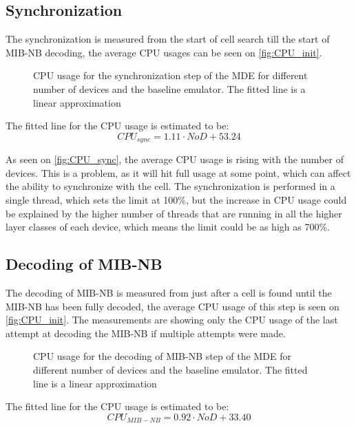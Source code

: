 \subsection{Synchronization}
The synchronization is  measured from the start of cell search till the start of MIB-NB decoding, the average CPU usages can be seen on \autoref{fig:CPU_init}.

\begin{figure}[H]
\centering
\resizebox{0.5\textwidth}{!}{
}
\caption{CPU usage for the synchronization step of the MDE for different number of devices and the baseline emulator. The fitted line is a linear approximation}
\label{fig:CPU_sync}
\end{figure}

The fitted line for the CPU usage is estimated to be:
\begin{equation}
CPU_{sync} = 1.11 \cdot NoD + 53.24
\end{equation}

As seen on \autoref{fig:CPU_sync}, the average CPU usage is rising with the number of devices. This is a problem, as it will hit full usage at some point, which can affect the ability to synchronize with the cell. The synchronization is performed in a single thread, which sets the limit at 100\%, but the increase in CPU usage could be explained by the higher number of threads that are running in all the higher layer classes of each device, which means the limit could be as high as 700\%. 

\subsection{Decoding of MIB-NB}
The decoding of MIB-NB is measured from just after a cell is found until the MIB-NB has been fully decoded, the average CPU usage of this step is seen on \autoref{fig:CPU_init}. The measurements are showing only the CPU usage of the last attempt at decoding the MIB-NB if multiple attempts were made.

\begin{figure}[H]
\centering
\resizebox{0.5\textwidth}{!}{
}
\caption{CPU usage for the decoding of MIB-NB step of the MDE for different number of devices and the baseline emulator. The fitted line is a linear approximation}
\label{fig:CPU_MIB}
\end{figure}

The fitted line for the CPU usage is estimated to be:
\begin{equation}
CPU_{MIB-NB} = 0.92 \cdot NoD + 33.40
\end{equation}


